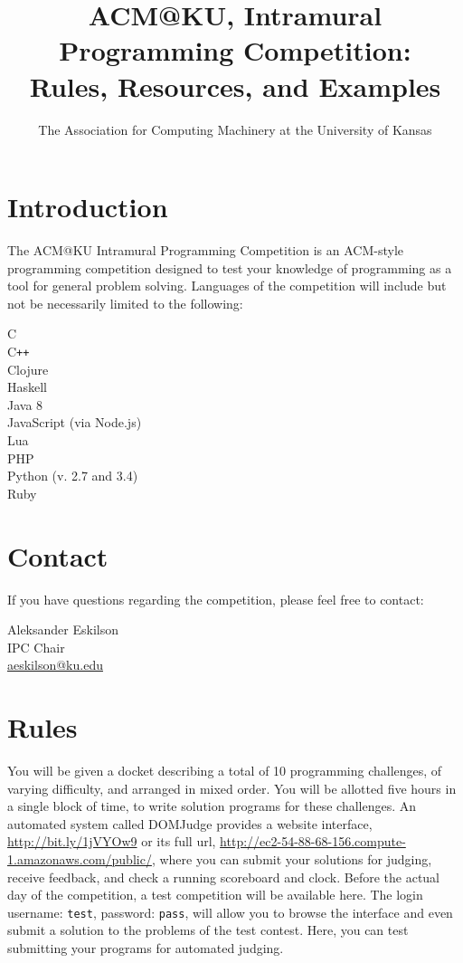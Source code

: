 \documentclass[a4paper]{article}
\title{ACM@KU, Intramural Programming Competition: \\ 
Rules, Resources, and Examples}
\date{\compDate}
\author{The Association for Computing Machinery at the University of Kansas}
\makeatletter
\def \competitionChairName {Aleksander Eskilson}
\def \competitionChairEmail {aeskilson@ku.edu}
\def \DOMJudgeURLShort {http://bit.ly/1jVYOw9}
\def \DOMJudgeURLLong {http://ec2-54-88-68-156.compute-1.amazonaws.com/public/}
\makeatother
\begin{document}
\maketitle

\tableofcontents

\newpage

\section{Introduction}

The ACM@KU Intramural Programming Competition is an ACM-style programming competition designed to test your knowledge of programming as a tool for general problem solving. Languages of the competition will include but not be necessarily limited to the following:
\begin{center}
    C \\
    C\texttt{++} \\
    Clojure \\
    Haskell \\
    Java 8 \\ 
    JavaScript (via Node.js) \\
    Lua \\
    PHP \\
    Python (v. 2.7 and 3.4) \\
    Ruby \\
\end{center}

\newpage

\section{Contact}

If you have questions regarding the competition, please feel free to contact:
\begin{center}
    \competitionChairName \\
    IPC Chair \\
    \url{\competitionChairEmail} \\
\end{center}

\newpage

\section{Rules}

You will be given a docket describing a total of 10 programming challenges, of varying difficulty, and arranged in mixed order. You will be allotted five hours in a single block of time, to write solution programs for these challenges. An automated system called DOMJudge provides a website interface, \url{\DOMJudgeURLShort} or its full url, \url{\DOMJudgeURLLong}, where you can submit your solutions for judging, receive feedback, and check a running scoreboard and clock. Before the actual day of the competition, a test competition will be available here. The login username: \texttt{test}, password: \texttt{pass}, will allow you to browse the interface and even submit a solution to the problems of the test contest. Here, you can test submitting your programs for automated judging. 
\end{document}
